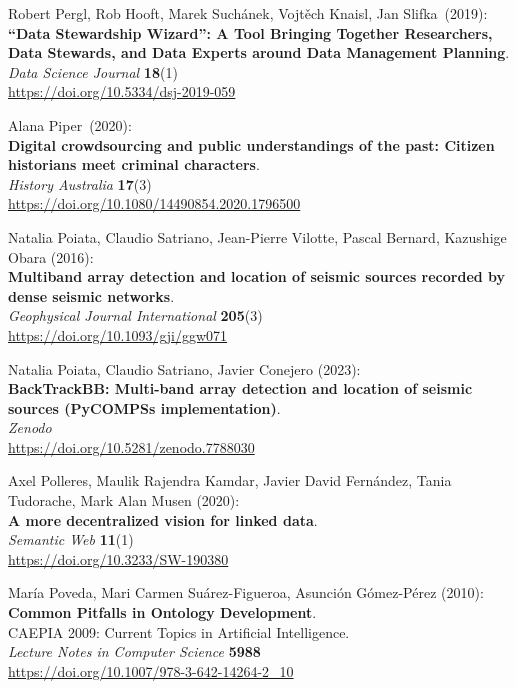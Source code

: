 \begin{thebibliography}{9}
Robert Pergl, Rob Hooft, Marek Suchánek, Vojtěch
Knaisl, Jan Slifka~(2019):\\
\textbf{``Data Stewardship Wizard'': A Tool Bringing Together
Researchers, Data Stewards, and Data Experts around Data Management
Planning}.\\
\emph{Data Science Journal} \textbf{18}(1)\\
\url{https://doi.org/10.5334/dsj-2019-059}

Alana Piper~(2020):\\
\textbf{Digital crowdsourcing and public understandings of the past:
Citizen historians meet criminal characters}.\\
\emph{History Australia} \textbf{17}(3) \\
\url{https://doi.org/10.1080/14490854.2020.1796500}

Natalia Poiata, Claudio Satriano, Jean-Pierre Vilotte, Pascal Bernard, Kazushige Obara (2016):\\
\textbf{Multiband array detection and location of seismic sources recorded by dense seismic networks}.\\
\emph{Geophysical Journal International} \textbf{205}(3)\\
\url{https://doi.org/10.1093/gji/ggw071}

Natalia Poiata, Claudio Satriano, Javier Conejero (2023):\\
\textbf{BackTrackBB: Multi-band array detection and location of seismic sources (PyCOMPSs implementation)}.\\
\emph{Zenodo}\\
\url{https://doi.org/10.5281/zenodo.7788030}


Axel Polleres, Maulik Rajendra Kamdar, Javier David Fernández, Tania
Tudorache, Mark Alan Musen (2020): \\
\textbf{A more decentralized vision for linked data}.\\ 
\emph{Semantic Web} \textbf{11}(1) \\
\url{https://doi.org/10.3233/SW-190380}

María Poveda, Mari Carmen Suárez-Figueroa, Asunción Gómez-Pérez (2010):\\
\textbf{Common Pitfalls in Ontology Development}.\\
CAEPIA 2009: Current Topics in Artificial Intelligence.\\
\emph{Lecture Notes in Computer Science} \textbf{5988}\\
\url{https://doi.org/10.1007/978-3-642-14264-2_10}\\


\end{thebibliography}
